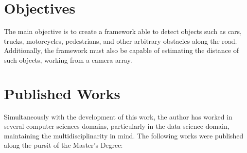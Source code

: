 \section{Objectives}

The main objective is to create a framework able to detect objects such as cars, trucks, motorcycles, pedestrians, and other arbitrary obstacles along the road. Additionally, the framework must also be capable of estimating the distance of such objects, working from a camera array.

\section{Published Works}

Simultaneously with the development of this work, the author has worked in several computer sciences domains, particularly in the data science domain, maintaining the multidisciplinarity in mind. The following works were published along the pursit of the Master's Degree:

